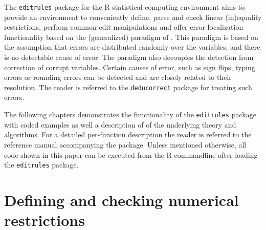 \documentclass[10pt, fleqn, a4paper]{article}
\begin{document}
The {\tt editrules} package for the R statistical computing environment
\citep{R-core:2011} aims to provide an environment to conveniently define,
parse and check linear (in)equality restrictions, perform common edit
manipulations and offer error localization functionality based on the
(generalized) paradigm of \cite{fellegi:1976}. This paradigm is based on the
assumption that errors are distributed randomly over the variables, and there
is no detectable cause of error. The paradigm also decouples the detection from
correction of corrupt variables. Certain causes of error, such as sign flips,
typing errors or rounding errors can be detected and are closely related to
their resolution. The reader is referred to the {\tt deducorrect} package
\citep{loo:2011, scholtus:2008, scholtus:2009} for treating such errors. 

The following chapters demonstrates the functionality of the {\tt editrules}
package with coded examples as well a description of of the underlying theory and
algorithms. For a detailed per-function description the reader is referred to
the reference manual accompanying the package. Unless mentioned otherwise,
all code shown in this paper can be executed from the R commandline after loading
the {\tt editrules} package.


\section{Defining and checking numerical restrictions}
\end{document}
